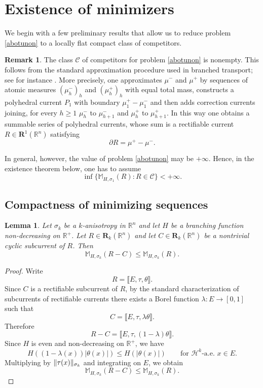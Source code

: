 \documentclass{article}
\numberwithin{equation}{section}
\theoremstyle{plain}%
\newtheorem{lemma}[theorem]{Lemma}
\theoremstyle{definition}
\newtheorem{rem}[theorem]{Remark}
\theoremstyle{definition}
\newcommand{\rgrande}{\mathbb{R}}
\newcommand{\haus}{\mathcal{H}}
\newcommand{\correttvar}[2]{\mathbf{R}_{#1}(\rgrande^{#2})}
\newcommand{\massaanisotropa}{\mathbb{M}_{H,\sigma_k}}
\newcommand{\massaanisotropauno}{\mathbb{M}_{H,\sigma_1}}
\DeclarePairedDelimiter{\norma}{\lVert}{\rVert} %
\begin{document}
\section{Existence of minimizers}\label{sec:min}
We begin with a few preliminary results that allow us to reduce problem \eqref{abotunon} to a locally flat compact class of competitors.

\begin{rem}\label{remsullinf}
The class $\mathcal C$ of competitors for problem \eqref{abotunon} is nonempty.
This follows from the standard approximation procedure used in branched transport; see for instance \cite[Prop.~3.1]{xia03}. More precisely, one approximates $\mu^-$ and $\mu^+$ by sequences of atomic measures
$(\mu_h^-)_{h}$ and $(\mu_h^+)_{h}$ with equal total mass, constructs a polyhedral current $P_1$
with boundary $\mu_1^+-\mu_1^-$ and then adds correction currents joining, for every $h\geq 1$ $\mu_h^-$ to $\mu_{h+1}^-$ and $\mu_h^+$ to $\mu_{h+1}^+$. In this way one obtains a summable series of polyhedral currents, whose sum is a rectifiable current
$R\in \mathbf R^1(\rgrande^n)$ satisfying
$$
\partial R=\mu^+-\mu^-.
$$

In general, however, the value of problem \eqref{abotunon} may be $+\infty$. Hence, in the existence theorem below, one has to assume
$$
\inf\{\massaanisotropauno(R):R\in\mathcal C\}<+\infty.
$$
\end{rem}

\subsection{Compactness of minimizing sequences}

\begin{lemma}\label{lemmaaciclica}
     Let $\sigma_k$ be a $k$-anisotropy in $\rgrande^n$ and let $H$ be a branching function non-decreasing on $\rgrande^+$. Let $R \in \correttvar{k}{n}$ and let $C \in \correttvar{k}{n}$ be a nontrivial cyclic subcurrent of $R$. Then
     $$
     \massaanisotropa(R-C) \leq \massaanisotropa (R).
     $$
\end{lemma}
\begin{proof}
Write
$$
R=\llbracket E,\tau,\theta\rrbracket.
$$
Since $C$ is a rectifiable subcurrent of $R$, by the standard characterization of subcurrents of rectifiable currents there exists a Borel function $\lambda:E\to [0,1]$ such that
$$
C=\llbracket E,\tau,\lambda\theta\rrbracket.
$$
Therefore
$$
R-C=\llbracket E,\tau,(1-\lambda)\theta\rrbracket.
$$
Since $H$ is even and non-decreasing on $\rgrande^+$, we have
$$
H((1-\lambda(x))|\theta(x)|)\le H(|\theta(x)|)
\qquad\text{for $\haus^k$-a.e. }x\in E.
$$
Multiplying by $\norma{\tau(x)}_{\sigma_k}$ and integrating on $E$, we obtain
$$
\massaanisotropa(R-C)\le \massaanisotropa(R).
$$
\end{proof}
\end{document}
